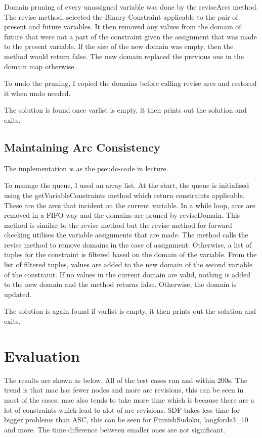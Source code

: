 \documentclass[11pt]{article}
\begin{document}
Domain pruning of every unassigned variable was done by the reviseArcs method. The revise method, selected the Binary Constraint applicable to the pair of present and future variables. It then removed any values from the domain of future that were not a part of the constraint given the assignment that was made to the present variable. If the size of the new domain was empty, then the method would return false. The new domain replaced the previous one in the domain map otherwise.

To undo the pruning, I copied the domains before calling revise arcs and restored it when undo needed.

The solution is found once varlist is empty, it then prints out the solution and exits.

\subsection{Maintaining Arc Consistency}
\label{sec:org823a1dc}
The implementation is as the pseudo-code in lecture.

To manage the queue, I used an array list. At the start, the queue is initialised using the getVariableConstraints method which return constraints applicable. These are the arcs that incident on the current variable. In a while loop, arcs are removed in a FIFO way and the domains are pruned by reviseDomain. This method is similar to the revise method but the revise method for forward checking utilises the variable assignments that are made. The method calls the revise method to remove domains in the case of assignment. Otherwise, a list of tuples for the constraint is filtered based on the domain of the variable. From the list of filtered tuples, values are added to the new domain of the second variable of the constraint. If no values in the current domain are valid, nothing is added to the new domain and the method returns false. Otherwise, the domain is updated.

The solution is again found if varlist is empty, it then prints out the solution and exits.

\section{Evaluation}
\label{sec:org0b9fdf5}
The results are shown as below. All of the test cases run and within 200s. The trend is that mac has fewer nodes and more arc revisions, this can be seen in most of the cases. mac also tends to take more time which is because there are a lot of constraints which lead to alot of arc revisions. SDF takes less time for bigger problems than ASC, this can be seen for FinnishSudoku, langfords3\_10 and more. The time difference between smaller ones are not significant.
\end{document}
